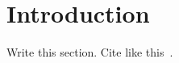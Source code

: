 \section{Introduction}\label{sec:introduction}

Write this section. Cite like this~\cite{example2024}.
